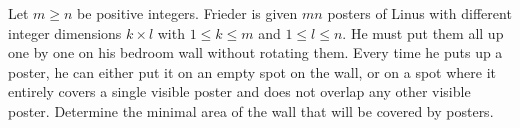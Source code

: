 Let $m\geq n$ be positive integers.
Frieder is given $mn$ posters of Linus with different integer dimensions $k \times l$
with $1 \le k \le m$ and $1 \le l \le n$.
He must put them all up one by one on his bedroom wall without rotating them.
Every time he puts up a poster, he can either put it on an empty spot on the wall,
or on a spot where it entirely covers a single visible poster and does not overlap any other visible poster.
Determine the minimal area of the wall that will be covered by posters.
